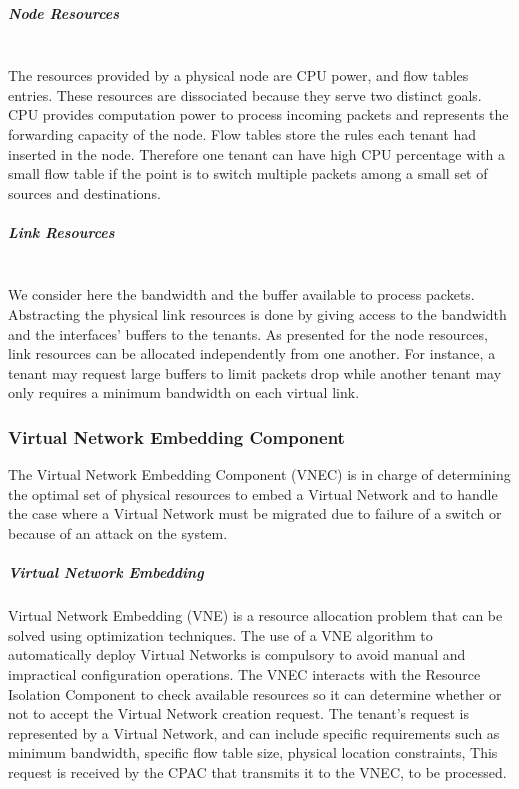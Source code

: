 \subparagraph{\textbf{Node Resources}}\textbf{}\\
The resources provided by a physical node are CPU power, and flow tables entries.
These resources are dissociated because they serve two distinct goals.
CPU provides computation power to process incoming packets and represents the forwarding capacity of the node.
Flow tables store the rules each tenant had inserted in the node.
Therefore one tenant can have high CPU percentage with a small flow table if the point is to switch multiple packets among a small set of sources and destinations.

\subparagraph{\textbf{Link Resources}}\textbf{}\\
We consider here the bandwidth and the buffer available to process packets.
Abstracting the physical link resources is done by giving access to the bandwidth and the interfaces' buffers to the tenants.
As presented for the node resources, link resources can be allocated independently from one another.
For instance, a tenant may request large buffers to limit packets drop while another tenant may only requires a minimum bandwidth on each virtual link.

\subsubsection{Virtual Network Embedding Component}

The Virtual Network Embedding Component (VNEC) is in charge of determining the optimal set of physical resources to embed a Virtual Network and to handle the case where a Virtual Network must be migrated due to failure of a switch or because of an attack on the system.

\subparagraph{Virtual Network Embedding}
Virtual Network Embedding (VNE) is a resource allocation problem that can be solved using optimization techniques.
The use of a VNE algorithm to automatically deploy Virtual Networks is compulsory to avoid manual and impractical configuration operations.
The VNEC interacts with the Resource Isolation Component to check available resources so it can determine whether or not to accept the Virtual Network creation request.
The tenant's request is represented by a Virtual Network, and can include specific requirements such as minimum bandwidth, specific flow table  size, physical location constraints, \etc 
This request is received by the CPAC that transmits it to the VNEC, to be processed.

